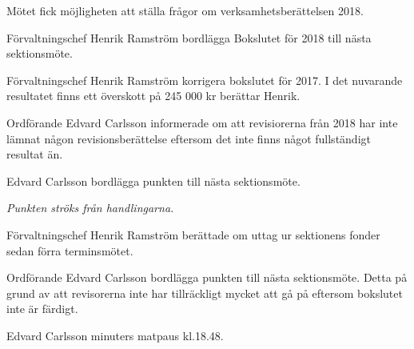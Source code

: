 \documentclass[10pt]{article}
\begin{document}
\begin{paragrafer}
Mötet fick möjligheten att ställa frågor om verksamhetsberättelsen 2018.

Förvaltningschef Henrik Ramström \ypa bordlägga Bokslutet för 2018 till nästa sektionsmöte.

\Mbaby

Förvaltningschef Henrik Ramström \ypa korrigera bokslutet för 2017. I det nuvarande resultatet finns ett överskott på 245 000 kr berättar Henrik. 

\Mbaby

Ordförande Edvard Carlsson informerade om att revisiorerna från 2018 har inte lämnat någon revisionsberättelse eftersom det inte finns något fullständigt resultat än.

Edvard Carlsson \ypa bordlägga punkten till nästa sektionsmöte.

\Mbaby


\textit{Punkten ströks från handlingarna.}

Förvaltningschef Henrik Ramström berättade om uttag ur sektionens fonder sedan förra terminsmötet.




  Ordförande Edvard Carlsson \ypa bordlägga punkten till nästa sektionsmöte. Detta på grund av att revisorerna inte har 
    tillräckligt mycket att gå på eftersom bokslutet inte är färdigt.

\Mbaby

Edvard Carlsson  minuters matpaus kl.18.48. 

\Mbaby


\end{paragrafer}
\end{document}
